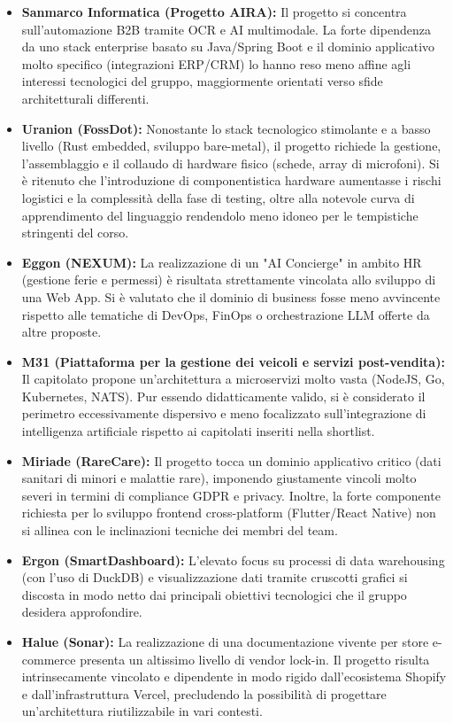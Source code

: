 \documentclass[a4paper, 11pt]{article}
\begin{document}
\begin{itemize}
    \item \textbf{Sanmarco Informatica (Progetto AIRA):} Il progetto si concentra sull'automazione B2B tramite OCR e AI multimodale. La forte dipendenza da uno stack enterprise basato su Java/Spring Boot e il dominio applicativo molto specifico (integrazioni ERP/CRM) lo hanno reso meno affine agli interessi tecnologici del gruppo, maggiormente orientati verso sfide architetturali differenti.
    
    \item \textbf{Uranion (FossDot):} Nonostante lo stack tecnologico stimolante e a basso livello (Rust embedded, sviluppo bare-metal), il progetto richiede la gestione, l'assemblaggio e il collaudo di hardware fisico (schede, array di microfoni). Si è ritenuto che l'introduzione di componentistica hardware aumentasse i rischi logistici e la complessità della fase di testing, oltre alla notevole curva di apprendimento del linguaggio rendendolo meno idoneo per le tempistiche stringenti del corso.
    
    \item \textbf{Eggon (NEXUM):} La realizzazione di un "AI Concierge" in ambito HR (gestione ferie e permessi) è risultata strettamente vincolata allo sviluppo di una Web App. Si è valutato che il dominio di business fosse meno avvincente rispetto alle tematiche di DevOps, FinOps o orchestrazione LLM offerte da altre proposte.
    
    \item \textbf{M31 (Piattaforma per la gestione dei veicoli e servizi post-vendita):} Il capitolato propone un'architettura a microservizi molto vasta (NodeJS, Go, Kubernetes, NATS). Pur essendo didatticamente valido, si è considerato il perimetro eccessivamente dispersivo e meno focalizzato sull'integrazione di intelligenza artificiale rispetto ai capitolati inseriti nella shortlist.
    
    \item \textbf{Miriade (RareCare):} Il progetto tocca un dominio applicativo critico (dati sanitari di minori e malattie rare), imponendo giustamente vincoli molto severi in termini di compliance GDPR e privacy. Inoltre, la forte componente richiesta per lo sviluppo frontend cross-platform (Flutter/React Native) non si allinea con le inclinazioni tecniche dei membri del team.
    
    \item \textbf{Ergon (SmartDashboard):} L'elevato focus su processi di data warehousing (con l'uso di DuckDB) e visualizzazione dati tramite cruscotti grafici si discosta in modo netto dai principali obiettivi tecnologici che il gruppo desidera approfondire.
    
    \item \textbf{Halue (Sonar):} La realizzazione di una documentazione vivente per store e-commerce presenta un altissimo livello di vendor lock-in. Il progetto risulta intrinsecamente vincolato e dipendente in modo rigido dall'ecosistema Shopify e dall'infrastruttura Vercel, precludendo la possibilità di progettare un'architettura riutilizzabile in vari contesti.
\end{itemize}
\end{document}
